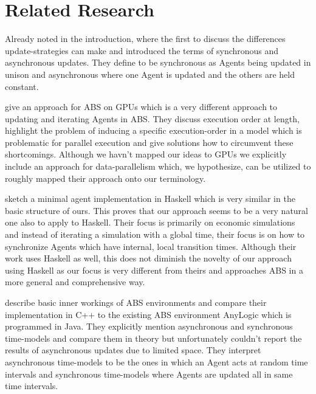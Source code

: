 \section{Related Research}
Already noted in the introduction, \cite{huberman_evolutionary_1993} where the first to discuss the differences update-strategies can make and introduced the terms of synchronous and asynchronous updates. They define to be synchronous as Agents being updated in unison and asynchronous where one Agent is updated and the others are held constant.

\medskip

\cite{a_framework_2008} give an approach for ABS on GPUs which is a very different approach to updating and iterating Agents in ABS. They discuss execution order at length, highlight the problem of inducing a specific execution-order in a model which is problematic for parallel execution and give solutions how to circumvent these shortcomings. Although we havn't mapped our ideas to GPUs we explicitly include an approach for data-parallelism which, we hypothesize, can be utilized to roughly mapped their approach onto our terminology. 
	
\medskip
	
\cite{botta_time_2010} sketch a minimal agent implementation in Haskell which is very similar in the basic structure of ours. This proves that our approach seems to be a very natural one also to apply to Haskell. Their focus is primarily on economic simulations and instead of iterating a simulation with a global time, their focus is on how to synchronize Agents which have internal, local transition times. Although their work uses Haskell as well, this does not diminish the novelty of our approach using Haskell as our focus is very different from theirs and approaches ABS in a more general and comprehensive way.

\medskip

\cite{dawson_opening_2014} describe basic inner workings of ABS environments and compare their implementation in C++ to the existing ABS environment AnyLogic which is programmed in Java. They explicitly mention asynchronous and synchronous time-models and compare them in theory but unfortunately couldn't report the results of asynchronous updates due to limited space. They interpret asynchronous time-models to be the ones in which an Agent acts at random time intervals and synchronous time-models where Agents are updated all in same time intervals.

\medskip

